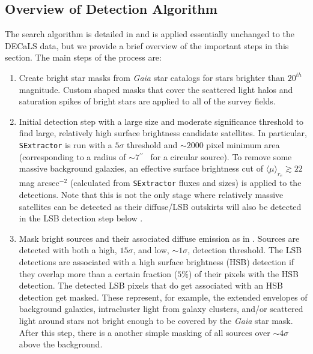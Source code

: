 \documentclass[twocolumn]{aastex62}
\newcommand{\arcs}{$^{\prime\prime}$} %
\begin{document}
\subsection{Overview of Detection Algorithm}
\label{sec:det_algo}
The search algorithm is detailed in \citet{carlsten2020a} and is applied essentially unchanged to the DECaLS data, but we provide a brief overview of the important steps in this section. The main steps of the process are:

\begin{enumerate}
    \item Create bright star masks from \emph{Gaia} star catalogs for stars brighter than $20^{th}$ magnitude. Custom shaped masks that cover the scattered light halos and saturation spikes of bright stars are applied to all of the survey fields. 
    
    \item Initial detection step with a large size and moderate significance threshold to find large, relatively high surface brightness candidate satellites. In particular, \texttt{SExtractor} is run with a $5\sigma$ threshold and $\sim2000$ pixel minimum area (corresponding to a radius of $\sim 7$\arcs~ for a circular source). To remove some massive background galaxies, an effective surface brightness cut of $\langle \mu \rangle_{r_e} \gtrsim 22$ mag arcsec$^{-2}$ (calculated from \texttt{SExtractor} fluxes and sizes) is applied to the detections. Note that this is not the only stage where relatively massive satellites can be detected as their diffuse/LSB outskirts will also be detected in the LSB detection step below \citep[and dwarfs universally have diffuse outskirts, see][]{kadofong2020}. 
    
    \item Mask bright sources and their associated diffuse emission as in \citet{greco2018}. Sources are detected with both a high, $15\sigma$, and low, $\sim1\sigma$, detection threshold. The LSB detections are associated with a high surface brightness (HSB) detection if they overlap more than a certain fraction ($5\%$) of their pixels with the HSB detection. The detected LSB pixels that do get associated with an HSB detection get masked. These represent, for example, the extended envelopes of background galaxies, intracluster light from galaxy clusters, and/or scattered light around stars not bright enough to be covered by the \emph{Gaia} star mask. After this step, there is a another simple masking of all sources over $\sim4\sigma$ above the background.
  

\end{enumerate}
\end{document}

